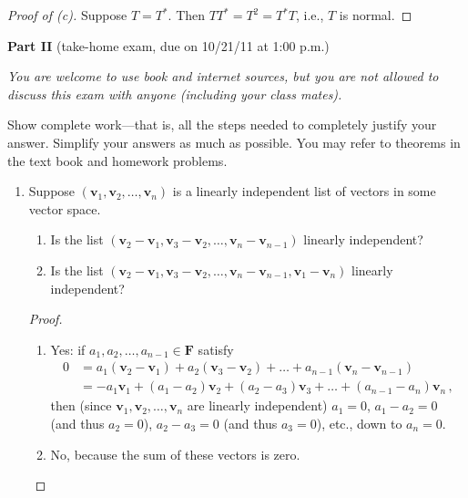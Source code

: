 \documentclass[12pt]{amsart}
\def\v{\mathbf v}
\def\F{\mathbf{F}}
\begin{document}
\begin{proof}[Proof of {\rm (c)}]
Suppose $T = T^*$. Then $T T^* = T^2 = T^* T$, i.e., $T$ is normal.
\end{proof}

\vspace{20pt}

{\bf Part II} (take-home exam, due on 10/21/11 at 1:00 p.m.)

{\it
You are welcome to use book and internet sources, but you are not allowed to discuss this exam with anyone (including your class mates).

Show complete work---that is, all the steps needed to completely justify your answer. Simplify your answers as much as possible. 
You may refer to theorems in the text book and homework problems.
}

\begin{enumerate} 

\item Suppose $\left( \v_1, \v_2, \dots, \v_n \right)$ is a linearly independent list of vectors in some vector space.
  \begin{enumerate} 
  \item Is the list $\left( \v_2 - \v_1, \v_3 - \v_2, \dots, \v_n - \v_{ n-1 } \right)$ linearly independent?
  \item Is the list $\left( \v_2 - \v_1, \v_3 - \v_2, \dots, \v_n - \v_{ n-1 }, \v_1 - \v_n \right)$ linearly independent?
  \end{enumerate}

\begin{proof}
\begin{enumerate}

\item Yes: if $a_1, a_2, \dots, a_{ n-1 } \in \F$ satisfy
\begin{align*}
  0
  &= a_1 \left( \v_2 - \v_1 \right) + a_2 \left( \v_3 - \v_2 \right) + \dots + a_{n-1} \left( \v_n - \v_{n-1} \right) \\
  &= - a_1 \v_1 + \left( a_1 - a_2 \right) \v_2 + \left( a_2 - a_3 \right) \v_3 + \dots + \left( a_{ n-1 } - a_n \right) \v_n \, ,
\end{align*}
then (since $\v_1, \v_2, \dots, \v_n$ are linearly independent) $a_1 = 0$, $a_1 - a_2 = 0$ (and thus $a_2 = 0$), $a_2 - a_3 = 0$ (and thus $a_3 = 0$), etc., down to $a_n = 0$.

\item No, because the sum of these vectors is zero. \qedhere


\end{enumerate}
\end{proof}
\end{enumerate}
\end{document}
